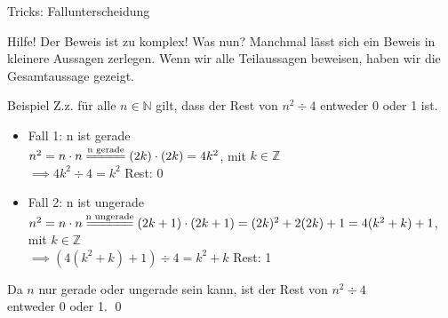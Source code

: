 %
%
%
%

\begin{frame}[fragile]{Tricks: Fallunterscheidung}
    \begin{alertblock}{Hilfe! Der Beweis ist zu komplex! Was nun?}
        Manchmal lässt sich ein Beweis in kleinere Aussagen zerlegen. Wenn wir alle Teilaussagen beweisen, haben wir die Gesamtaussage gezeigt.
    \end{alertblock}
    \small\begin{exampleblock}{Beispiel}
        Z.z. für alle $n\in\mathbb{N}$ gilt, dass der Rest von $n^2 \div 4$ entweder 0 oder 1 ist.
        \footnotesize\begin{itemize}
            \item 
                \alert{Fall 1:} n ist gerade\\
                $n^2=n\cdot n\overset{\text{n gerade}}{=\joinrel=\joinrel=\joinrel=\joinrel=}(2k)\cdot(2k) = 4k^2$,  mit $k\in\mathbb{Z}$\\
                $\implies 4k^2 \div 4 = k^2$ Rest: 0
            \item \alert{Fall 2:} n ist ungerade\\
                $n^2=n\cdot n\overset{\text{n ungerade}}{=\joinrel=\joinrel=\joinrel=\joinrel=\joinrel=}(2k+1)\cdot(2k+1)=(2k)^2+2(2k)+1=4(k^2+k)+1$, \\mit $k\in\mathbb{Z}$\\
                $\implies (4(k^2+k)+1) \div 4= k^2+k$ Rest: 1
        \end{itemize}
        Da $n$ nur gerade oder ungerade sein kann, ist der Rest von $n^2\div4$ \\entweder 0 oder 1. \qed\;
    \end{exampleblock}
\end{frame}

